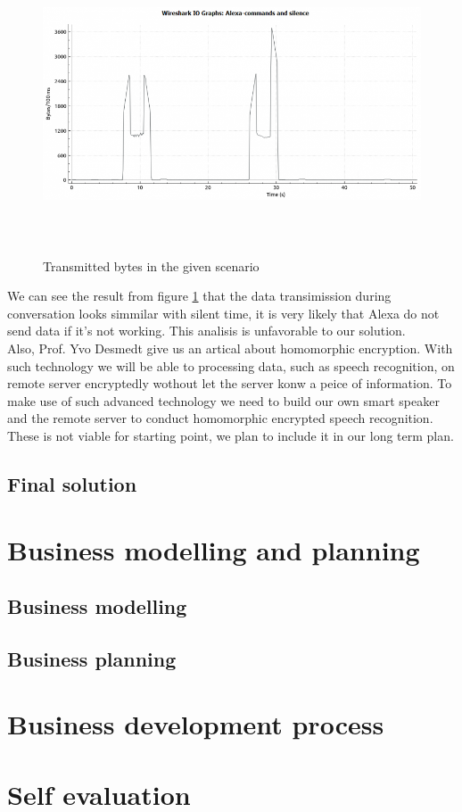 \documentclass[12pt,twoside]{article}
\begin{document}
\begin{itemize}
\begin{figure}[hbp]
\centering
\includegraphics[width=5.00in,height=3.5in]{alexa_wakeup_and_pause-400x204.png}
\caption{Transmitted bytes in the given scenario}
\label{fig:Transmitted bytes in the given scenario}
\end{figure}
\end{itemize}
We can see the result from figure \ref{fig:Transmitted bytes in the given scenario} that the data transimission during conversation looks simmilar with
silent time, it is very likely that Alexa do not send data if it's not working. This analisis is unfavorable to our solution.\\
Also, Prof. Yvo Desmedt give us an artical \cite{bourse2017fast} about homomorphic encryption. With such technology we will be able to processing data, 
such as speech recognition, on remote server encryptedly wothout let the server konw a peice of information. To make use of such advanced technology 
we need to build our own smart speaker and the remote server to conduct homomorphic encrypted speech recognition. These is not viable for starting point, 
we plan to include it in our long term plan. 


\subsection{Final solution}




\section{Business modelling and planning}
\label{sec:Business modelling and planning}
\subsection{Business modelling}
\subsection{Business planning}


\section{Business development process}
\label{sec:Business development process}

\section{Self evaluation}



\end{document}

